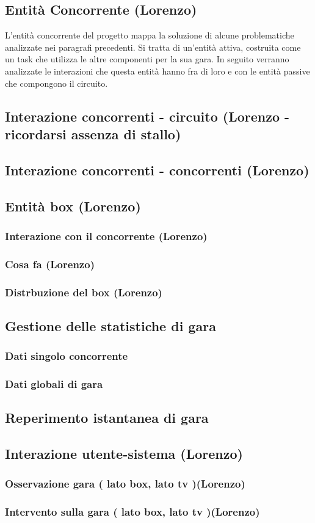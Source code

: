 \subsection{Entit\`{a} Concorrente (Lorenzo)}
L'entità concorrente del progetto mappa la soluzione di alcune problematiche analizzate nei paragrafi precedenti. Si tratta di un'entità attiva, costruita come un task che utilizza le altre componenti per la sua gara. In seguito verranno analizzate le interazioni che questa entità hanno fra di loro e con le entità passive che compongono il circuito.
\subsection{Interazione concorrenti - circuito (Lorenzo - ricordarsi assenza di stallo)}
\subsection{Interazione concorrenti - concorrenti (Lorenzo)}
\subsection{Entità box (Lorenzo)}
     \subsubsection{Interazione con il concorrente (Lorenzo)}
     \subsubsection{Cosa fa (Lorenzo)}
     \subsubsection{Distrbuzione del box (Lorenzo)}
\subsection{Gestione delle statistiche di gara}
     \subsubsection{Dati singolo concorrente}
     \subsubsection{Dati globali di gara}
\subsection{Reperimento istantanea di gara}
\subsection{Interazione utente-sistema (Lorenzo)}
     \subsubsection{Osservazione gara ( lato box, lato tv )(Lorenzo)}
     \subsubsection{Intervento sulla gara ( lato box, lato tv )(Lorenzo)}